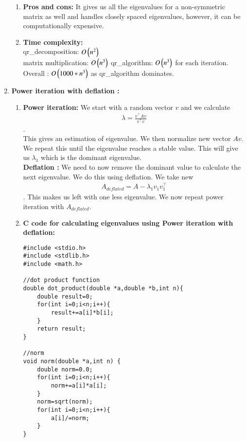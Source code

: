 \documentclass[journal]{IEEEtran}
\begin{document}
\begin{enumerate}
\begin{enumerate}
     \item \textbf{Pros and cons:} It gives us all the eigenvalues for a non-symmetric matrix as well and handles closely spaced eigenvalues, however, it can be computationally expensive. \\
     \item \textbf{Time complexity:} \\
     qr\_decomposition: $O\left(n^2\right)$\\
     matrix multiplication: $O\left(n^3\right)$
     qr\_algorithm: $O\left(n^3\right)$ for each iteration.\\
     Overall : $O\left(1000*n^3\right)$ as qr\_algorithm dominates.
    \end{enumerate}
\item \textbf{Power iteration with deflation :}\\
\begin{enumerate}
    \item \textbf{Power iteration:} We start with a random vector $v$ and we calculate  \begin{align}
        \lambda=\frac{v^\top Av}{v^\top v}
    \end{align}.\\
    This gives an estimation of eigenvalue. We then normalize new vector $Av$. We repeat this until the eigenvalue reaches a stable value. This will give us $\lambda _1$ which is the dominant eigenvalue. \\

    \textbf{Deflation :} We need to now remove the dominant value to calculate the next eigenvalue. We do this using deflation. We take new \begin{align}
        A_{deflated}=A-\lambda _1 v_1 v_1^\top
    \end{align}. This makes us left with one less eigenvalue. We now repeat power iteration with $A_{deflated}.$\\
    
    \item \textbf{C code for calculating eigenvalues using Power iteration with deflation:} 
    \begin{lstlisting}
#include <stdio.h>
#include <stdlib.h>
#include <math.h>

//dot product function
double dot_product(double *a,double *b,int n){
    double result=0;
    for(int i=0;i<n;i++){
        result+=a[i]*b[i];
    }
    return result;
}

//norm
void norm(double *a,int n) {
    double norm=0.0;
    for(int i=0;i<n;i++){
        norm+=a[i]*a[i];
    }
    norm=sqrt(norm);
    for(int i=0;i<n;i++){
        a[i]/=norm;
    }
}


\end{lstlisting}
\end{enumerate}
\end{enumerate}
\end{document}

